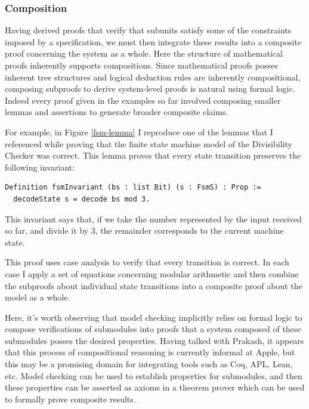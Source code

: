 \documentclass[10pt,a4paper]{article}
\begin{document}
\subsubsection{Composition}
Having derived proofs that verify that subunits satisfy some of the constraints imposed by a specification, we must then integrate these results into a composite proof concerning the system as a whole. Here the structure of mathematical proofs inherently supports compositions. Since mathematical proofs posses inherent tree structures and logical deduction rules are inherently compositional, composing subproofs to derive system-level proofs is natural using formal logic. Indeed every proof given in the examples so far involved composing smaller lemmas and assertions to generate broader composite claims.

For example, in Figure \ref{fsm-lemma} I reproduce one of the lemmas that I referenced while proving that the finite state machine model of the Divisibility Checker was correct. This lemma proves that every state transition preserves the following invariant:

\begin{verbatim}
Definition fsmInvariant (bs : list Bit) (s : FsmS) : Prop :=
  decodeState s = decode bs mod 3.
\end{verbatim}

This invariant says that, if we take the number represented by the input received so far, and divide it by 3, the remainder corresponds to the current machine state. 

This proof uses case analysis to verify that every transition is correct. In each case I apply a set of equations concerning modular arithmetic and then combine the subproofs about individual state transitions into a composite proof about the model as a whole.

Here, it’s worth observing that model checking implicitly relies on formal logic to compose verifications of submodules into proofs that a system composed of these submodules posses the desired properties. Having talked with Prakash, it appears that this process of compositional reasoning is currently informal at Apple, but this may be a promising domain for integrating tools such as Coq, APL, Lean, etc. Model checking can be used to establish properties for submodules, and then these properties can be asserted as axioms in a theorem prover which can be used to formally prove composite results.
\end{document}
